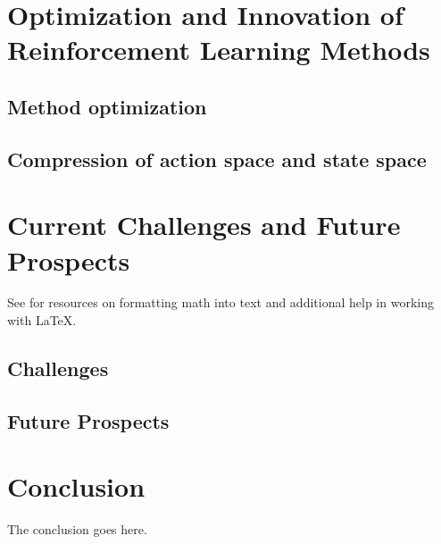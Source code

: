 \documentclass[journal]{IEEEtran}
\begin{document}
\section{Optimization and Innovation of Reinforcement Learning Methods}

\subsection{Method optimization}

\subsection{Compression of action space and state space}

\section{Current Challenges and Future Prospects}
See for resources on formatting math into text and additional help in working with \LaTeX .

\subsection{Challenges}

\subsection{Future Prospects}

\section{Conclusion}
The conclusion goes here.








\vfill
\end{document}
